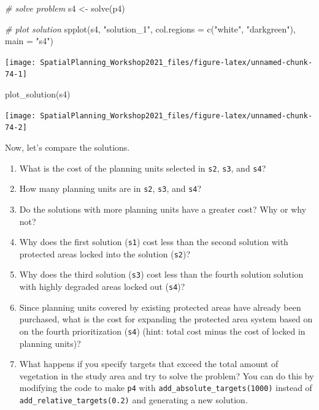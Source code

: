 \documentclass[
  12pt,
]{book}
\newenvironment{Shaded}{\begin{snugshade}}{\end{snugshade}}
\newcommand{\AttributeTok}[1]{\textcolor[rgb]{0.77,0.63,0.00}{#1}}
\newcommand{\CommentTok}[1]{\textcolor[rgb]{0.56,0.35,0.01}{\textit{#1}}}
\newcommand{\FunctionTok}[1]{\textcolor[rgb]{0.00,0.00,0.00}{#1}}
\newcommand{\NormalTok}[1]{#1}
\newcommand{\OtherTok}[1]{\textcolor[rgb]{0.56,0.35,0.01}{#1}}
\newcommand{\StringTok}[1]{\textcolor[rgb]{0.31,0.60,0.02}{#1}}
\providecommand{\tightlist}{%
  \setlength{\itemsep}{0pt}\setlength{\parskip}{0pt}}
\begin{document}
\begin{Shaded}
\begin{Highlighting}[]
\CommentTok{\# solve problem}
\NormalTok{s4 }\OtherTok{\textless{}{-}} \FunctionTok{solve}\NormalTok{(p4)}

\CommentTok{\# plot solution}
\FunctionTok{spplot}\NormalTok{(s4, }\StringTok{"solution\_1"}\NormalTok{, }\AttributeTok{col.regions =} \FunctionTok{c}\NormalTok{(}\StringTok{"white"}\NormalTok{, }\StringTok{"darkgreen"}\NormalTok{), }\AttributeTok{main =} \StringTok{"s4"}\NormalTok{)}
\end{Highlighting}
\end{Shaded}

\begin{center}\texttt{[image: SpatialPlanning\_Workshop2021\_files/figure-latex/unnamed-chunk-74-1]} \end{center}

\begin{Shaded}
\begin{Highlighting}[]
\FunctionTok{plot\_solution}\NormalTok{(s4)}
\end{Highlighting}
\end{Shaded}

\begin{center}\texttt{[image: SpatialPlanning\_Workshop2021\_files/figure-latex/unnamed-chunk-74-2]} \end{center}

\clearpage

Now, let's compare the solutions.

\begin{rmdquestion}
\begin{enumerate}
\def\labelenumi{\arabic{enumi}.}
\tightlist
\item
  What is the cost of the planning units selected in \texttt{s2}, \texttt{s3}, and \texttt{s4}?
\item
  How many planning units are in \texttt{s2}, \texttt{s3}, and \texttt{s4}?
\item
  Do the solutions with more planning units have a greater cost? Why or why not?
\item
  Why does the first solution (\texttt{s1}) cost less than the second solution with protected areas locked into the solution (\texttt{s2})?
\item
  Why does the third solution (\texttt{s3}) cost less than the fourth solution solution with highly degraded areas locked out (\texttt{s4})?
\item
  Since planning units covered by existing protected areas have already been purchased, what is the cost for expanding the protected area system based on on the fourth prioritization (\texttt{s4}) (hint: total cost minus the cost of locked in planning units)?
\item
  What happens if you specify targets that exceed the total amount of vegetation in the study area and try to solve the problem? You can do this by modifying the code to make \texttt{p4} with \texttt{add\_absolute\_targets(1000)} instead of \texttt{add\_relative\_targets(0.2)} and generating a new solution.
\end{enumerate}
\end{rmdquestion}
\end{document}
